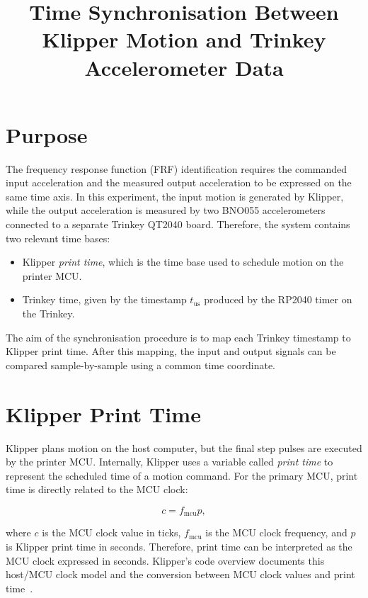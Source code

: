 \documentclass[11pt,a4paper]{article}
\title{Time Synchronisation Between Klipper Motion and Trinkey Accelerometer Data}
\author{}
\date{}
\begin{document}
\maketitle

\section{Purpose}

The frequency response function (FRF) identification requires the commanded
input acceleration and the measured output acceleration to be expressed on the
same time axis. In this experiment, the input motion is generated by Klipper,
while the output acceleration is measured by two BNO055 accelerometers connected
to a separate Trinkey QT2040 board. Therefore, the system contains two relevant
time bases:

\begin{itemize}
    \item Klipper \emph{print time}, which is the time base used to schedule
    motion on the printer MCU.
    \item Trinkey time, given by the timestamp \(t_{\mathrm{us}}\) produced by
    the RP2040 timer on the Trinkey.
\end{itemize}

The aim of the synchronisation procedure is to map each Trinkey timestamp to
Klipper print time. After this mapping, the input and output signals can be
compared sample-by-sample using a common time coordinate.

\section{Klipper Print Time}

Klipper plans motion on the host computer, but the final step pulses are
executed by the printer MCU. Internally, Klipper uses a variable called
\emph{print time} to represent the scheduled time of a motion command. For the
primary MCU, print time is directly related to the MCU clock:

\begin{equation}
    c = f_{\mathrm{mcu}} p,
\end{equation}

where \(c\) is the MCU clock value in ticks, \(f_{\mathrm{mcu}}\) is the MCU
clock frequency, and \(p\) is Klipper print time in seconds. Therefore, print
time can be interpreted as the MCU clock expressed in seconds. Klipper's code
overview documents this host/MCU clock model and the conversion between MCU
clock values and print time~\cite{klippercodeoverview}.
\end{document}
